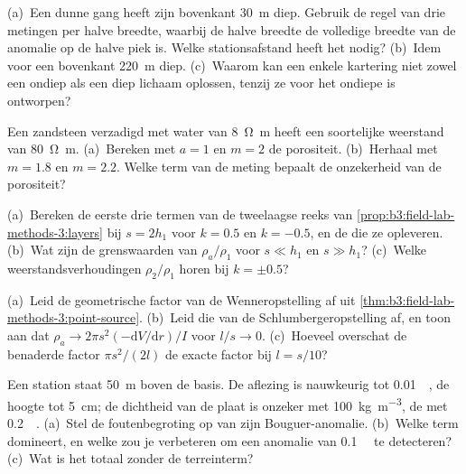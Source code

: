 \begin{exercise}[$\star\star$]\label{exo:b3:field-lab-methods-3:7}
(a)~Een dunne gang heeft zijn bovenkant \qty{30}{m} diep. Gebruik de regel van drie
metingen per halve breedte, waarbij de halve breedte de volledige breedte van de
anomalie op de halve piek is. Welke stationsafstand heeft het nodig? (b)~Idem voor
een bovenkant \qty{220}{m} diep. (c)~Waarom kan een enkele kartering niet
zowel een ondiep als een diep lichaam oplossen, tenzij ze voor het ondiepe
is ontworpen?
\end{exercise}

\begin{exercise}[$\star\star$]\label{exo:b3:field-lab-methods-3:8}
Een zandsteen verzadigd met water van \qty{8}{\ohm\metre} heeft een
soortelijke weerstand van \qty{80}{\ohm\metre}. (a)~Bereken met $a = 1$ en $m = 2$
de porositeit. (b)~Herhaal met $m = 1.8$ en $m = 2.2$. Welke
term van de meting bepaalt de onzekerheid van de porositeit?
\end{exercise}

\begin{exercise}[$\star\star$]\label{exo:b3:field-lab-methods-3:9}
(a)~Bereken de eerste drie termen van de tweelaagse reeks
van \cref{prop:b3:field-lab-methods-3:layers} bij $s = 2h_1$ voor $k =
\num{0.5}$ en $k = \num{-0.5}$, en de  die
ze opleveren. (b)~Wat zijn de grenswaarden van $\rho_a/\rho_1$ voor $s \ll h_1$ en
$s \gg h_1$? (c)~Welke weerstandsverhoudingen $\rho_2/\rho_1$ horen bij
$k = \pm 0.5$?
\end{exercise}

\begin{exercise}[$\star\star\star$]\label{exo:b3:field-lab-methods-3:10}
(a)~Leid de geometrische factor van de Wenneropstelling af uit
\cref{thm:b3:field-lab-methods-3:point-source}. (b)~Leid die van de
Schlumbergeropstelling af, en toon aan dat $\rho_a \to 2\pi s^2(-\mathrm{d}V/
\mathrm{d}r)/I$ voor $l/s \to 0$. (c)~Hoeveel overschat de benaderde
factor $\pi s^2/(2l)$ de exacte factor bij $l = s/10$?
\end{exercise}

\begin{exercise}[$\star\star\star$]\label{exo:b3:field-lab-methods-3:11}
Een station staat \qty{50}{m} boven de basis. De aflezing is nauwkeurig tot
\qty{0.01}{\milli\gal}, de hoogte tot \qty{5}{cm}; de dichtheid van de
plaat is onzeker met \qty{100}{kg.m^{-3}}, de  met
\qty{0.2}{\milli\gal}. (a)~Stel de foutenbegroting op van zijn
Bouguer-anomalie. (b)~Welke term domineert, en welke zou je verbeteren om
een anomalie van \qty{0.1}{\milli\gal} te detecteren? (c)~Wat is het totaal
zonder de terreinterm?
\end{exercise}

